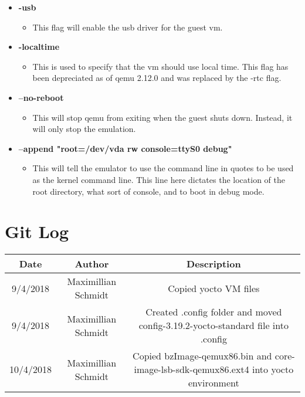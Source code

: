 \documentclass[10pt,onecolumn,draftclsnofoot]{IEEEtran} %
\begin{document}
\begin{singlespace}
\begin{itemize}
    \item \textbf{-usb}
    \begin{itemize}
      \item This flag will enable the usb driver for the guest vm.
    \end{itemize}

    \item \textbf{-localtime }
    \begin{itemize}
      \item This is used to specify that the vm should use local time. This flag has been depreciated as of qemu 2.12.0 and was replaced by the -rtc flag.
    \end{itemize}

    \item \textbf{--no-reboot}
    \begin{itemize}
      \item This will stop qemu from exiting when the guest shuts down. Instead, it will only stop the emulation.
    \end{itemize}

    \item \textbf{--append "root=/dev/vda rw console=ttyS0 debug"}
    \begin{itemize}
      \item This will tell the emulator to use the command line in quotes to be used as the kernel command line. This line here dictates the location of the root directory, what sort of console, and to boot in debug mode.
    \end{itemize}

  \end{itemize}


\section{\bf Git Log}
 	\begin{center}
 \begin{tabular}{||c c c||} 
 \hline
 Date & Author & Description \\
 \hline
 9/4/2018 & Maximillian Schmidt & Copied yocto VM files \\ 
 \hline
 9/4/2018 & Maximillian Schmidt & Created .config folder and moved config-3.19.2-yocto-standard file into .config \\
 \hline
 10/4/2018 & Maximillian Schmidt & Copied bzImage-qemux86.bin and core-image-lsb-sdk-qemux86.ext4 into yocto environment \\
 \hline
\end{tabular}
	\end{center}


\end{singlespace}
\end{document}

